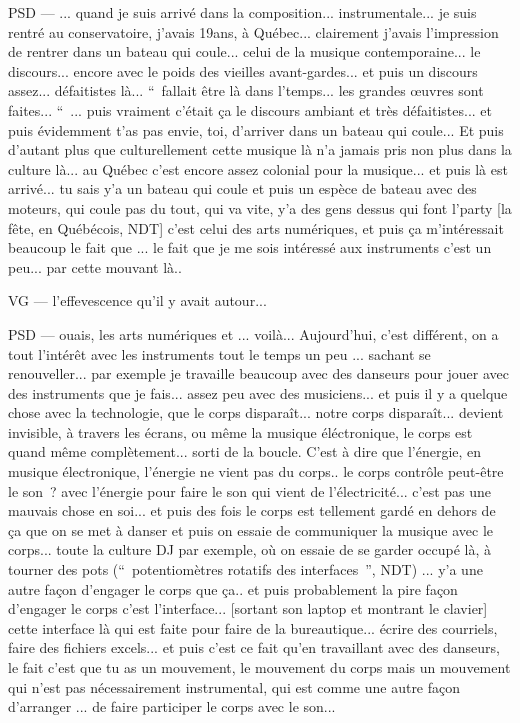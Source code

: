 PSD — ... quand je suis arrivé dans la composition... instrumentale... je suis rentré au conservatoire, j'avais 19ans, à Québec... clairement j'avais l'impression de rentrer dans un bateau qui coule... celui de la musique contemporaine... le discours... encore avec le poids des vieilles avant-gardes... et puis un discours assez... défaitistes là... “ fallait être là dans l'temps... les grandes œuvres sont faites... “ ... puis vraiment c'était ça le discours ambiant et très défaitistes... et puis évidemment t'as pas envie, toi, d'arriver dans un bateau qui coule... Et puis d'autant plus que culturellement cette musique là n'a jamais pris non plus dans la culture là... au Québec c'est encore assez colonial pour la musique... et puis là est arrivé... tu sais y'a un bateau qui coule et puis un espèce de bateau avec des moteurs, qui coule pas du tout, qui va vite, y'a des gens dessus qui font l'party [la fête, en Québécois, NDT] c'est celui des arts numériques, et puis ça m'intéressait beaucoup le fait que ... le fait que je me sois intéressé aux instruments c'est un peu... par cette mouvant là.. 

VG — l'effevescence qu'il y avait autour... 

PSD — ouais, les arts numériques et ... voilà... Aujourd'hui, c'est différent, on a tout l'intérêt avec les instruments tout le temps un peu  ... sachant se renouveller... par exemple je travaille beaucoup avec des danseurs pour jouer avec des instruments que je fais... assez peu avec des musiciens... et puis il y a quelque chose avec la technologie, que le corps disparaît... notre corps disparaît... devient invisible, à travers les écrans, ou même la musique éléctronique, le corps est quand même complètement... sorti de la boucle. C'est à dire que l'énergie, en musique électronique, l'énergie ne vient pas du corps.. le corps contrôle peut-être le son ? avec l'énergie pour faire le son qui vient de l'électricité... c'est pas une mauvais chose en soi... et puis des fois le corps est tellement gardé en dehors de ça que on se met à danser et puis on essaie de communiquer la musique avec le corps... toute la culture DJ par exemple, où on essaie de se garder occupé là, à tourner des pots (“ potentiomètres rotatifs des interfaces ”, NDT) ... y'a une autre façon d'engager le corps que ça.. et puis probablement la pire façon d'engager le corps c'est l'interface... [sortant son laptop et montrant le clavier] cette interface là qui est faite pour faire de la bureautique... écrire des courriels, faire des  fichiers excels... et puis c'est ce fait qu'en travaillant avec des danseurs, le fait c'est que tu as un mouvement, le mouvement du corps mais un mouvement qui n'est pas nécessairement instrumental, qui est comme une autre façon d'arranger ... de faire participer le corps avec le son... 

